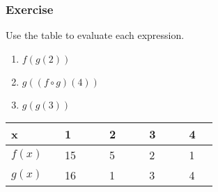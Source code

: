 \documentclass[12pt]{beamer}
\begin{document}
\begin{frame}
	\frametitle{Exercise}
	\vspace*{\fill}
	\vspace*{\fill}
	\initclock
	\vspace*{\fill}
	Use the table to evaluate each expression.
	\begin{multicols}{3}
		\begin{enumerate}
			\item $f(g(2))$
			\item $g((f\circ g)(4))$
			\item $g(g(3))$
		\end{enumerate}
	\end{multicols}
	\vspace*{\fill}
	\begin{center}
		\begin{table}[]
			\begin{tabular}{|l|l|l|l|l|}
				\hline
				x$\quad$$\quad$ & $\quad$1$\quad$  & $\quad$2$\quad$ & $\quad$3$\quad$ & $\quad$4$\quad$ \\ \hline
				$f(x)$                 & $\quad$15$\quad$ & $\quad$5$\quad$ & $\quad$2$\quad$ & $\quad$1$\quad$ \\ \hline
				$g(x)$                 & $\quad$16$\quad$ & $\quad$1$\quad$ & $\quad$3$\quad$ & $\quad$4$\quad$ \\ \hline
			\end{tabular}
		\end{table}
	\end{center}
	\vspace*{\fill}
	\vspace*{\fill}
	\crono
\end{frame}
\end{document}
